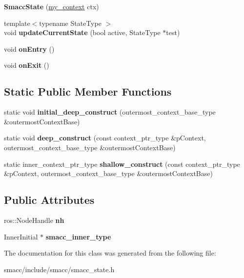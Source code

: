 \begin{DoxyCompactItemize}
{\bfseries Smacc\+State} (\hyperlink{structsmacc_1_1SmaccState_1_1my__context}{my\+\_\+context} ctx)
\item 
\mbox{\label{classsmacc_1_1SmaccState_abc2a2b5e635b0ba09fcb350710b20117}} 
{\footnotesize template$<$typename State\+Type $>$ }\\void {\bfseries update\+Current\+State} (bool active, State\+Type $\ast$test)
\item 
\mbox{\label{classsmacc_1_1SmaccState_a4a10a74fdbe51a798b8d651668b8ed9a}} 
void {\bfseries on\+Entry} ()
\item 
\mbox{\label{classsmacc_1_1SmaccState_a82ca7c69153e86dc5eedf3f909560f3a}} 
void {\bfseries on\+Exit} ()
\end{DoxyCompactItemize}
\subsection*{Static Public Member Functions}
\begin{DoxyCompactItemize}
\item 
\mbox{\label{classsmacc_1_1SmaccState_af4b4635d16a32bdd3956e5d40ddbd01d}} 
static void {\bfseries initial\+\_\+deep\+\_\+construct} (outermost\+\_\+context\+\_\+base\+\_\+type \&outermost\+Context\+Base)
\item 
\mbox{\label{classsmacc_1_1SmaccState_aac23d8a6909f75c5e5fca2a7c09b5368}} 
static void {\bfseries deep\+\_\+construct} (const context\+\_\+ptr\+\_\+type \&p\+Context, outermost\+\_\+context\+\_\+base\+\_\+type \&outermost\+Context\+Base)
\item 
\mbox{\label{classsmacc_1_1SmaccState_a1dccb401e1a99031863a21a590d953e6}} 
static inner\+\_\+context\+\_\+ptr\+\_\+type {\bfseries shallow\+\_\+construct} (const context\+\_\+ptr\+\_\+type \&p\+Context, outermost\+\_\+context\+\_\+base\+\_\+type \&outermost\+Context\+Base)
\end{DoxyCompactItemize}
\subsection*{Public Attributes}
\begin{DoxyCompactItemize}
\item 
\mbox{\label{classsmacc_1_1SmaccState_a5e0564f2114c6af88a4a8ed6bba97f40}} 
ros\+::\+Node\+Handle {\bfseries nh}
\item 
\mbox{\label{classsmacc_1_1SmaccState_a087d0f66729b98614feb8c59ea548af1}} 
Inner\+Initial $\ast$ {\bfseries smacc\+\_\+inner\+\_\+type}
\end{DoxyCompactItemize}


The documentation for this class was generated from the following file\+:\begin{DoxyCompactItemize}
\item 
smacc/include/smacc/smacc\+\_\+state.\+h\end{DoxyCompactItemize}

